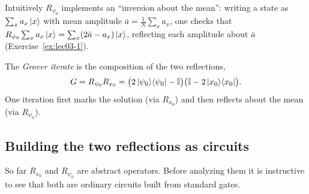 Intuitively $R_{\psi_0}$ implements an ``inversion about the mean'': writing a
state as $\sum_x a_x\ket{x}$ with mean amplitude $\bar a=\tfrac1N\sum_x a_x$, one
checks that $R_{\psi_0}\sum_x a_x\ket{x}=\sum_x(2\bar a-a_x)\ket{x}$, reflecting
each amplitude about $\bar a$ (Exercise~\ref{ex:lec03-1}).

\begin{definition}
\label{def:lec03-iterate}
The \emph{Grover iterate} is the composition of the two reflections,
\[
  G=R_{\psi_0}R_{x_0}
   =\bigl(2\ket{\psi_0}\!\bra{\psi_0}-\mathbb{I}\bigr)\bigl(\mathbb{I}-2\ket{x_0}\!\bra{x_0}\bigr).
\]
One iteration first marks the solution (via $R_{x_0}$) and then reflects about the
mean (via $R_{\psi_0}$).
\end{definition}

\subsection{Building the two reflections as circuits}
\label{sec:lec03-circuits}

So far $R_{x_0}$ and $R_{\psi_0}$ are abstract operators. Before analyzing them it
is instructive to see that both are ordinary circuits built from standard gates.

